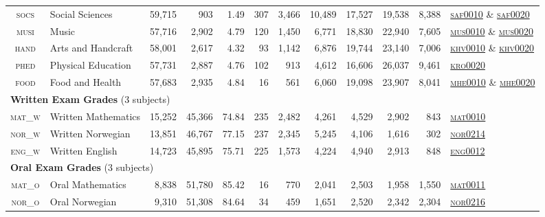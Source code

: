 {\begin{tabular}{clrrrrrrrrrl}
    \textsc{socs}  & Social Sciences & 59,715 & 903   & 1.49  & 307   & 3,466 & 10,489 & 17,527 & 19,538 & 8,388 & \href{https://www.udir.no/lk20/fagkoder/saf0010}{\textsc{saf0010}} \& \href{https://www.udir.no/lk20/fagkoder/saf0020}{\textsc{saf0020}} \\
    \textsc{musi}  & Music & 57,716 & 2,902 & 4.79  & 120   & 1,450 & 6,771 & 18,830 & 22,940 & 7,605 & \href{https://www.udir.no/lk20/fagkoder/mus0010}{\textsc{mus0010}} \& \href{https://www.udir.no/lk20/fagkoder/mus0020}{\textsc{mus0020}} \\
    \textsc{hand}  & Arts and Handcraft & 58,001 & 2,617 & 4.32  & 93    & 1,142 & 6,876 & 19,744 & 23,140 & 7,006 & \href{https://www.udir.no/lk20/fagkoder/khv0010}{\textsc{khv0010}} \& \href{https://www.udir.no/lk20/fagkoder/khv0020}{\textsc{khv0020}} \\
    \textsc{phed}  & Physical Education & 57,731 & 2,887 & 4.76  & 102   & 913   & 4,612 & 16,606 & 26,037 & 9,461 & \href{https://www.udir.no/lk20/fagkoder/kro0020}{\textsc{kro0020}} \\
    \textsc{food}  & Food and Health & 57,683 & 2,935 & 4.84  & 16    & 561   & 6,060 & 19,098 & 23,907 & 8,041 & \href{https://www.udir.no/lk20/fagkoder/mhe0010}{\textsc{mhe0010}} \& \href{https://www.udir.no/lk20/fagkoder/mhe0020}{\textsc{mhe0020}} \\
        \multicolumn{12}{l}{\textbf{Written Exam Grades} (3 subjects)}\\
    \textsc{mat\_w} & Written Mathematics & 15,252 & 45,366 & 74.84 & 235   & 2,482 & 4,261 & 4,529 & 2,902 & 843   & \href{https://www.udir.no/lk20/fagkoder/mat0010}{\textsc{mat0010}} \\
    \textsc{nor\_w} & Written Norwegian & 13,851 & 46,767 & 77.15 & 237   & 2,345 & 5,245 & 4,106 & 1,616 & 302   & \href{https://www.udir.no/lk20/fagkoder/nor0214}{\textsc{nor0214}} \\
    \textsc{eng\_w} & Written English & 14,723 & 45,895 & 75.71 & 225   & 1,573 & 4,224 & 4,940 & 2,913 & 848   & \href{https://www.udir.no/lk20/fagkoder/eng0012}{\textsc{eng0012}} \\
        \multicolumn{12}{l}{\textbf{Oral Exam Grades} (3 subjects)}\\
    \textsc{mat\_o} & Oral Mathematics & 8,838 & 51,780 & 85.42 & 16    & 770   & 2,041 & 2,503 & 1,958 & 1,550 & \href{https://www.udir.no/lk20/fagkoder/mat0011}{\textsc{mat0011}} \\
    \textsc{nor\_o} & Oral Norwegian & 9,310 & 51,308 & 84.64 & 34    & 459   & 1,651 & 2,520 & 2,342 & 2,304 & \href{https://www.udir.no/lk20/fagkoder/nor0216}{\textsc{nor0216}} \\

\end{tabular}}
